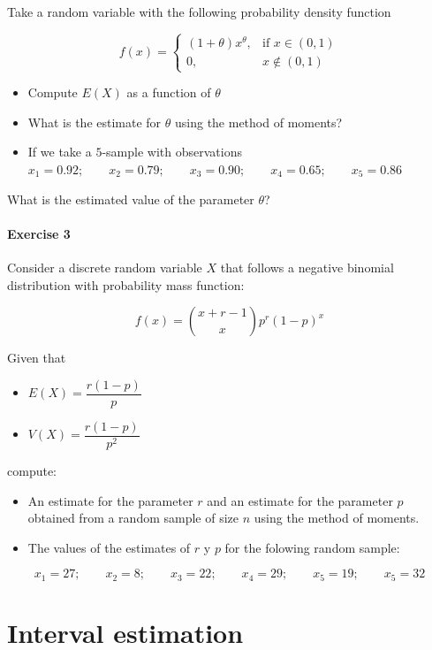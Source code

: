 \documentclass[
]{book}
\providecommand{\tightlist}{%
  \setlength{\itemsep}{0pt}\setlength{\parskip}{0pt}}
\begin{document}
Take a random variable with the following probability density function

\[
f(x)=
\begin{cases}
    (1+\theta)x^\theta,& \text{if } x\in (0,1)\\
    0,& x\notin (0,1)
\end{cases}
\]

\begin{itemize}
\tightlist
\item
  Compute \(E(X)\) as a function of \(\theta\)
\item
  What is the estimate for \(\theta\) using the method of moments?
\item
  If we take a \(5\)-sample with observations
  \(x_1 = 0.92; \qquad x_2 = 0.79; \qquad x_3 = 0.90; \qquad x_4 = 0.65; \qquad x_5 = 0.86\)
\end{itemize}

What is the estimated value of the parameter \(\theta\)?

\hypertarget{exercise-3-7}{%
\subsubsection{Exercise 3}\label{exercise-3-7}}

Consider a discrete random variable \(X\) that follows a negative binomial distribution with probability mass function:

\[f(x) = \binom{x+r-1}{x}p^r(1-p)^x\]

Given that

\begin{itemize}
\tightlist
\item
  \(E(X)=\dfrac{r(1-p)}{p}\)
\item
  \(V(X) =\dfrac{r(1-p)}{p^2}\)
\end{itemize}

compute:

\begin{itemize}
\item
  An estimate for the parameter \(r\) and an estimate for the parameter \(p\) obtained from a random sample of size \(n\) using the method of moments.
\item
  The values of the estimates of \(r\) y \(p\) for the folowing random sample:
\end{itemize}

\[x_1 = 27; \qquad x_2 = 8; \qquad  x_3 = 22; \qquad  x_4 = 29; \qquad  x_5 = 19; \qquad  x_5 = 32\]

\hypertarget{interval-estimation}{%
\chapter{Interval estimation}\label{interval-estimation}}
\end{document}
